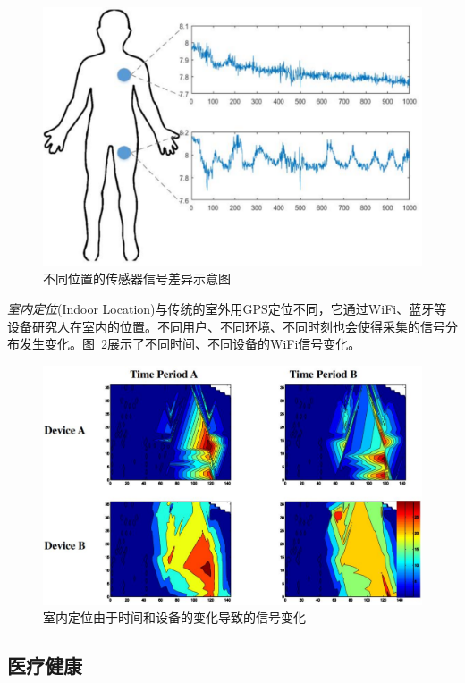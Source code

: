 \begin{figure}[htbp]
	\centering
	\includegraphics[scale=0.42]{./figures/fig-app-time.pdf}
	\caption{不同位置的传感器信号差异示意图}
	\label{fig-app-activity}
\end{figure}

\textit{室内定位}(Indoor Location)与传统的室外用GPS定位不同，它通过WiFi、蓝牙等设备研究人在室内的位置。不同用户、不同环境、不同时刻也会使得采集的信号分布发生变化。图~\ref{fig-app-location}展示了不同时间、不同设备的WiFi信号变化。

\begin{figure}[htbp]
	\centering
	\includegraphics[scale=0.42]{./figures/fig-app-location.pdf}
	\caption{室内定位由于时间和设备的变化导致的信号变化}
	\label{fig-app-location}
\end{figure}

\subsection{医疗健康}

